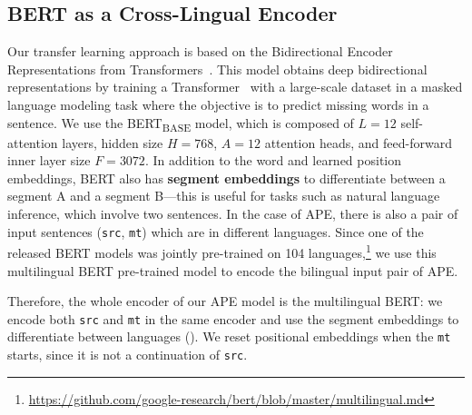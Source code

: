 \subsection{BERT as a Cross-Lingual Encoder}

Our transfer learning approach is based on the Bidirectional Encoder
Representations from Transformers~\citep[BERT;][]{devlin2018bert}.
This model obtains deep bidirectional representations by training a
Transformer~\citep{vaswani2017attention} with a large-scale dataset
in a masked language modeling task where the objective is to predict
missing words in a sentence. We use the BERT\textsubscript{BASE}
model, which is composed of $L=12$ self-attention layers, hidden size
$H=768$, $A=12$ attention heads, and feed-forward inner layer size
$F=3072$. In addition to the word and learned position embeddings,
BERT also has {\bf segment embeddings} to differentiate between a
segment A and a segment B---this is useful for tasks such as natural
language inference, which involve two sentences. In the case of APE,
there is also a pair of input sentences ({\tt src}, {\tt mt}) which
are in different languages. Since one of the released BERT models was
jointly pre-trained on 104 languages,\footnote{
  \url{https://github.com/google-research/bert/blob/master/multilingual.md}}
we use this multilingual BERT pre-trained model to encode the
bilingual input pair of APE.

Therefore, the whole encoder of our APE model is the multilingual
BERT: we encode both {\tt src} and {\tt mt} in the same encoder and
use the segment embeddings to differentiate between languages
(). We reset positional
embeddings when the {\tt mt} starts, since it is not a continuation
of {\tt src}.


